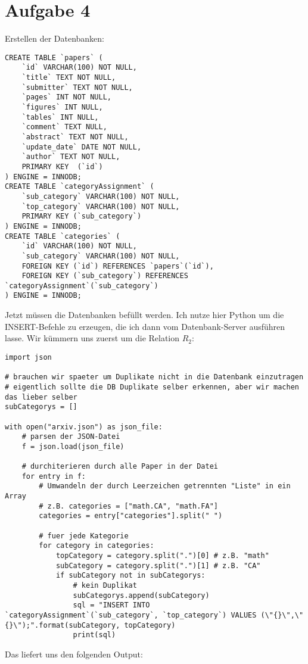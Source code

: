 \documentclass{article}
\begin{document}
	\section*{Aufgabe 4}
	Erstellen der Datenbanken:
	\begin{lstlisting}[style=sql, tabsize=2]
CREATE TABLE `papers` ( 
	`id` VARCHAR(100) NOT NULL,
	`title` TEXT NOT NULL,
	`submitter` TEXT NOT NULL,
	`pages` INT NOT NULL,
	`figures` INT NULL,
	`tables` INT NULL,
	`comment` TEXT NULL,
	`abstract` TEXT NOT NULL,
	`update_date` DATE NOT NULL,
	`author` TEXT NOT NULL,
	PRIMARY KEY  (`id`)
) ENGINE = INNODB;
CREATE TABLE `categoryAssignment` (
	`sub_category` VARCHAR(100) NOT NULL,
	`top_category` VARCHAR(100) NOT NULL,
	PRIMARY KEY (`sub_category`)
) ENGINE = INNODB;
CREATE TABLE `categories` (
	`id` VARCHAR(100) NOT NULL,
	`sub_category` VARCHAR(100) NOT NULL,
	FOREIGN KEY (`id`) REFERENCES `papers`(`id`),
	FOREIGN KEY (`sub_category`) REFERENCES `categoryAssignment`(`sub_category`)
) ENGINE = INNODB;
	\end{lstlisting}
	Jetzt müssen die Datenbanken befüllt werden. Ich nutze hier Python um die INSERT-Befehle zu erzeugen, die ich dann vom Datenbank-Server ausführen lasse. Wir kümmern uns zuerst um die Relation $R_2$:
	\begin{lstlisting}[style=python, tabsize=2]
import json

# brauchen wir spaeter um Duplikate nicht in die Datenbank einzutragen
# eigentlich sollte die DB Duplikate selber erkennen, aber wir machen das lieber selber
subCategorys = []

with open("arxiv.json") as json_file:
	# parsen der JSON-Datei
	f = json.load(json_file)

	# durchiterieren durch alle Paper in der Datei
	for entry in f:
		# Umwandeln der durch Leerzeichen getrennten "Liste" in ein Array
		# z.B. categories = ["math.CA", "math.FA"]
		categories = entry["categories"].split(" ")

		# fuer jede Kategorie
		for category in categories:
			topCategory = category.split(".")[0] # z.B. "math"
			subCategory = category.split(".")[1] # z.B. "CA"
			if subCategory not in subCategorys:
				# kein Duplikat
				subCategorys.append(subCategory)
				sql = "INSERT INTO `categoryAssignment`(`sub_category`, `top_category`) VALUES (\"{}\",\"{}\");".format(subCategory, topCategory)
				print(sql)
	\end{lstlisting}
	Das liefert uns den folgenden Output:
\end{document}
